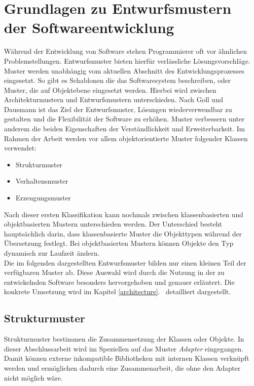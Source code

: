\chapter{Grundlagen zu Entwurfsmustern der Softwareentwicklung} \label{swa}

Während der Entwicklung von Software stehen Programmierer oft vor ähnlichen Problemstellungen. Entwurfsmuster bieten hierfür verlässliche Lösungsvorschläge\cite{goll:swa}. Muster werden unabhängig vom aktuellen Abschnitt des Entwicklungsprozesses eingesetzt. So gibt es Schablonen die das Softwaresystem beschreiben, oder Muster, die auf Objektebene eingesetzt werden. Hierbei wird zwischen Architekturmustern und Entwurfsmustern unterschieden. Nach Goll und Dausmann \cite[3.1, 3.2]{goll:swa} ist das Ziel der Entwurfsmuster, Lösungen wiederverwendbar zu gestalten und die Flexibilität der Software zu erhöhen. Muster verbessern unter anderem die beiden Eigenschaften der Verständlichkeit und Erweiterbarkeit. Im Rahmen der Arbeit werden vor allem objektorientierte Muster folgender Klassen verwendet:

\begin{itemize}
\item Strukturmuster
\item Verhaltensmuster
\item Erzeugungsmuster
\end{itemize}

Nach dieser ersten Klassifikation kann nochmals zwischen klassenbasierten und objektbasierten Mustern unterschieden werden. Der Unterschied besteht hauptsächlich darin, dass klassenbasierte Muster die Objekttypen während der Übersetzung festlegt. Bei objektbasierten Mustern können Objekte den  Typ dynamisch zur Laufzeit ändern\cite[4.1]{goll:swa}.\\
Die im folgenden dargestellten Entwurfsmuster bilden nur einen kleinen Teil der verfügbaren Muster ab. Diese Auswahl wird durch die Nutzung in der zu entwickelnden Software besonders hervorgehoben und genauer erläutert. Die konkrete Umsetzung wird im Kapitel \glqq \ref{architecture}.  \grqq\ detailliert dargestellt.

\section{Strukturmuster}
Strukturmuster bestimmen die Zusammensetzung der Klassen oder Objekte. In dieser Abschlussarbeit wird im Speziellen auf das Muster \textit{Adapter} eingegangen. Damit können externe inkompatible Bibliotheken mit internen Klassen verknüpft werden und ermöglichen dadurch eine Zusammenarbeit, die ohne den Adapter nicht möglich wäre.

